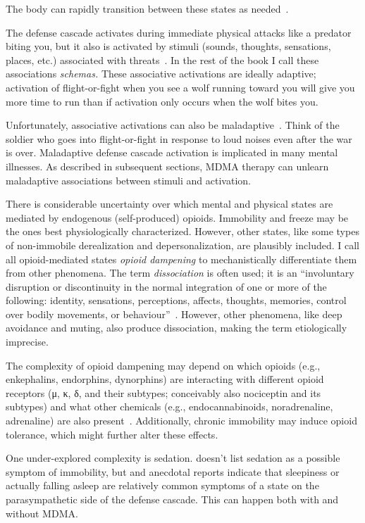 \documentclass[11pt,oneside]{book}
\let\cite\parencite
\begin{document}
The body can rapidly transition between these states as needed~\cite{kozlowskaDefenseCascade}.

The defense cascade activates during immediate physical attacks like a predator biting you, but it also is activated by stimuli (sounds, thoughts, sensations, places, etc.) associated with threats~\cite{kozlowskaDefenseCascade}. In the rest of the book I call these associations \textit{schemas.} These associative activations are ideally adaptive; activation of flight-or-fight when you see a wolf running toward you will give you more time to run than if activation only occurs when the wolf bites you.

Unfortunately, associative activations can also be maladaptive~\cite{kozlowskaDefenseCascade}. Think of the soldier who goes into flight-or-fight in response to loud noises even after the war is over. Maladaptive defense cascade activation is implicated in many mental illnesses. As described in subsequent sections, MDMA therapy can unlearn maladaptive associations between stimuli and activation.

There is considerable uncertainty over which mental and physical states are mediated by endogenous (self-produced) opioids. Immobility and freeze may be the ones best physiologically characterized. However, other states, like some types of non-immobile derealization and depersonalization, are plausibly included. I call all opioid-mediated states \textit{opioid dampening} to mechanistically differentiate them from other phenomena. The term \textit{dissociation} is often used; it is an \enquote{involuntary disruption or discontinuity in the normal integration of one or more of the following: identity, sensations, perceptions, affects, thoughts, memories, control over bodily movements, or behaviour}~\cite[sec. Dissociative disorders]{icd11}. However, other phenomena, like deep avoidance and muting, also produce dissociation, making the term etiologically imprecise.

The complexity of opioid dampening may depend on which opioids (e.g., enkephalins, endorphins, dynorphins) are interacting with different opioid receptors (μ, κ, δ, and their subtypes; conceivably also nociceptin and its subtypes) and what other chemicals (e.g., endocannabinoids, noradrenaline, adrenaline) are also present~\cite{laniusNeurobiology}. Additionally, chronic immobility may induce opioid tolerance, which might further alter these effects.

One under-explored complexity is sedation. \textcite{kozlowskaDefenseCascade} doesn't list sedation as a possible symptom of immobility, but \textcite{razviPSIP} and anecdotal reports indicate that sleepiness or actually falling asleep are relatively common symptoms of a state on the parasympathetic side of the defense cascade. This can happen both with and without MDMA.
\end{document}
